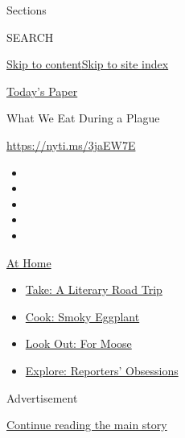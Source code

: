 Sections

SEARCH

\protect\hyperlink{site-content}{Skip to
content}\protect\hyperlink{site-index}{Skip to site index}

\href{https://myaccount.nytimes3xbfgragh.onion/auth/login?response_type=cookie\&client_id=vi}{}

\href{https://www.nytimes3xbfgragh.onion/section/todayspaper}{Today's
Paper}

What We Eat During a Plague

\url{https://nyti.ms/3jaEW7E}

\begin{itemize}
\item
\item
\item
\item
\item
\end{itemize}

\href{https://www.nytimes3xbfgragh.onion/spotlight/at-home?action=click\&pgtype=Article\&state=default\&region=TOP_BANNER\&context=at_home_menu}{At
Home}

\begin{itemize}
\tightlist
\item
  \href{https://www.nytimes3xbfgragh.onion/2020/07/28/books/time-for-a-literary-road-trip.html?action=click\&pgtype=Article\&state=default\&region=TOP_BANNER\&context=at_home_menu}{Take:
  A Literary Road Trip}
\item
  \href{https://www.nytimes3xbfgragh.onion/2020/07/29/magazine/bored-with-your-home-cooking-some-smoky-eggplant-will-fix-that.html?action=click\&pgtype=Article\&state=default\&region=TOP_BANNER\&context=at_home_menu}{Cook:
  Smoky Eggplant}
\item
  \href{https://www.nytimes3xbfgragh.onion/2020/07/27/travel/moose-michigan-isle-royale.html?action=click\&pgtype=Article\&state=default\&region=TOP_BANNER\&context=at_home_menu}{Look
  Out: For Moose}
\item
  \href{https://www.nytimes3xbfgragh.onion/interactive/2020/at-home/even-more-reporters-editors-diaries-lists-recommendations.html?action=click\&pgtype=Article\&state=default\&region=TOP_BANNER\&context=at_home_menu}{Explore:
  Reporters' Obsessions}
\end{itemize}

Advertisement

\protect\hyperlink{after-top}{Continue reading the main story}

